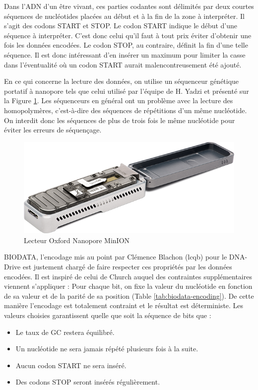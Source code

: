 \documentclass[a4paper]{report}
\begin{document}
Dans l'ADN d'un être vivant, ces parties codantes sont délimités par deux courtes séquences de nucléotides placées au début et à la fin de la zone à interpréter.
Il s'agit des codons START et STOP.
Le codon START indique le début d'une séquence à interpréter.
C'est donc celui qu'il faut à tout prix éviter d'obtenir une fois les données encodées.
Le codon STOP, au contraire, définit la fin d'une telle séquence.
Il est donc intéressant d'en insérer un maximum pour limiter la casse dans l'éventualité où un codon START aurait malencontreusement été ajouté.

En ce qui concerne la lecture des données, on utilise un séquenceur génétique portatif à
nanopore tels que celui utilisé par l’équipe de H. Yadzi \cite{yazdi2017portable} et présenté sur la Figure \ref{fig:oxford-nanopore-minion}.
Les séquenceurs en général ont un problème avec la lecture des homopolymères, c’est-à-dire des
séquences de répétitions d’un même nucléotide. On interdit donc les séquences de plus de trois fois
le même nucléotide pour éviter les erreurs de séquençage.

\begin{figure}[ht]
\centering
\includegraphics[width=.6\textwidth]{oxford-nanopore-minion}
\caption{Lecteur Oxford Nanopore MinION}
\label{fig:oxford-nanopore-minion}
\end{figure}

BIODATA, l'encodage mis au point par Clémence Blachon (\ac{lcqb}) pour le DNA-Drive est justement chargé de faire respecter ces propriétés par les données encodées.
Il est inspiré de celui de Church auquel des contraintes supplémentaires viennent s'appliquer :
Pour chaque bit, on fixe la valeur du nucléotide en fonction de sa valeur et de la parité de sa position (Table \ref{tab:biodata-encoding}).
De cette manière l'encodage est totalement contraint et le résultat est déterministe.
Les valeurs choisies garantissent quelle que soit la séquence de bits que :

\begin{itemize}
  \item Le taux de GC restera équilibré.
  \item Un nucléotide ne sera jamais répété plusieurs fois à la suite.
  \item Aucun codon START ne sera inséré.
  \item Des codons STOP seront insérés régulièrement.
\end{itemize}
\end{document}
